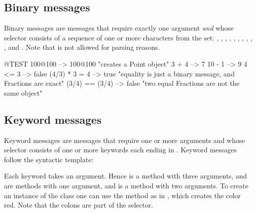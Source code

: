 \documentclass[a4paper,10pt,twoside]{book}
\begin{document}
\subsection{Binary messages} 
Binary messages are messages that require exactly one argument \emph{and} whose selector consists of a sequence of one or more characters from the set: \ct{+}, \ct{-}, \ct{*}, \ct{/}, \ct{&}, \ct{=}, \ct{>}, \ct{|}, \ct{<}, \ct{~}, and . Note that \ct{--} is not allowed for parsing reasons.

\begin{code}{@TEST}
100@100      --> 100@100  "creates a Point object"
3 + 4              --> 7
10 - 1            --> 9
4 <= 3            --> false
(4/3) * 3 = 4   --> true  "equality is just a binary message, and Fractions are exact"
(3/4) == (3/4) --> false  "two equal Fractions are not the same object"
\end{code}


\subsection{Keyword messages} 

Keyword messages are messages that require one or more arguments and whose selector consists of one or more keywords each ending in \ct{:}.  Keyword messages follow the syntactic template: 

Each keyword takes an argument. Hence  is a method with three arguments,  and  are methods with one argument, and  is a method with two arguments. To create an instance of the class  one can use the method  as in , which creates the color red. Note that the colons are part of the selector.

\end{document}
